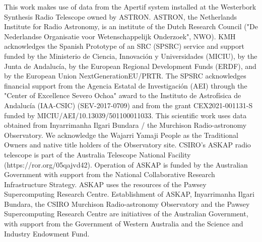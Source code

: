 \documentclass{iau}
\begin{document}
This work makes use of data from the Apertif system installed at the Westerbork Synthesis Radio Telescope owned by ASTRON. ASTRON, the Netherlands Institute for Radio Astronomy, is an institute of the Dutch Research Council ("De Nederlandse Organisatie voor Wetenschappelijk Onderzoek", NWO). KMH acknowledges the Spanish Prototype of an SRC (SPSRC) service and support funded by the Ministerio de Ciencia, Innovación y Universidades (MICIU), by the Junta de Andalucía, by the European Regional Development Funds (ERDF), and by the European Union NextGenerationEU/PRTR. The SPSRC acknowledges financial support from the Agencia Estatal de Investigación (AEI) through the "Center of Excellence Severo Ochoa" award to the Instituto de Astrofísica de Andalucía (IAA-CSIC) (SEV-2017-0709) and from the grant CEX2021-001131-S funded by MICIU/AEI/10.13039/501100011033. This scientific work uses data obtained from Inyarrimanha Ilgari Bundara / the Murchison Radio-astronomy Observatory. We acknowledge the Wajarri Yamaji People as the Traditional Owners and native title holders of the Observatory site. CSIRO's ASKAP radio telescope is part of the Australia Telescope National Facility (https://ror.org/05qajvd42). Operation of ASKAP is funded by the Australian Government with support from the National Collaborative Research Infrastructure Strategy. ASKAP uses the resources of the Pawsey Supercomputing Research Centre. Establishment of ASKAP, Inyarrimanha Ilgari Bundara, the CSIRO Murchison Radio-astronomy Observatory and the Pawsey Supercomputing Research Centre are initiatives of the Australian Government, with support from the Government of Western Australia and the Science and Industry Endowment Fund.




\end{document}
